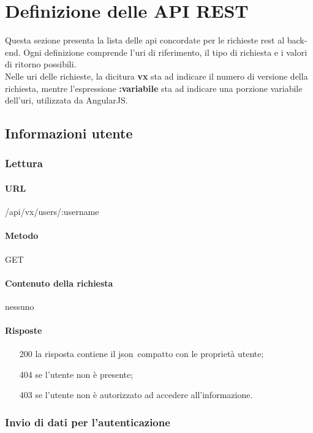 
\section{Definizione delle API REST}
Questa sezione presenta la lista delle \gls{api} concordate per le richieste \gls{rest} al \gls{back-end}. Ogni definizione comprende l'\gls{uri} di riferimento, il tipo di richiesta e i valori di ritorno possibili.\\
Nelle \gls{uri} delle richieste, la dicitura \textbf{vx} sta ad indicare il numero di versione della richiesta, mentre l'espressione \textbf{:variabile} sta ad indicare una porzione variabile dell'\gls{uri}, utilizzata da AngularJS.

\subsection{Informazioni utente}

\subsubsection{Lettura}

\paragraph{URL}
/api/vx/users/:username
\paragraph{Metodo}
GET
\paragraph{Contenuto della richiesta}
nessuno
\paragraph{Risposte}
\begin{itemize}
	\item[200] la risposta contiene il \gls{json}\glsfirstoccur\  compatto con le proprietà utente;
	\item[404] se l'utente non è presente;
	\item[403] se l'utente non è autorizzato ad accedere all'informazione.
\end{itemize}


\subsubsection{Invio di dati per l'autenticazione}
